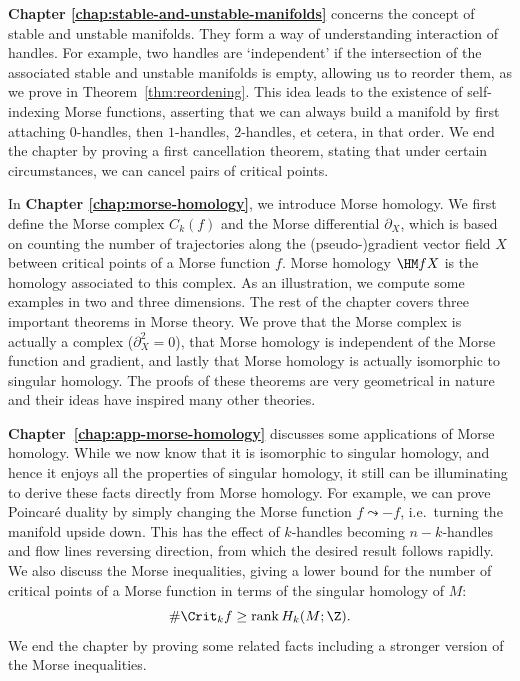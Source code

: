 \bigskip

\textbf{Chapter \ref{chap:stable-and-unstable-manifolds}} concerns the concept of stable and unstable manifolds.
They form a way of understanding interaction of handles.
For example, two handles are `independent' if the intersection of the associated stable and unstable manifolds is empty, allowing us to reorder them, as we prove in Theorem~\ref{thm:reordening}.
This idea leads to the existence of self-indexing Morse functions, asserting that we can always build a manifold by first attaching $0$-handles, then $1$-handles, $2$-handles, et cetera, in that order.
We end the chapter by proving a first cancellation theorem, stating that under certain circumstances, we can cancel pairs of critical points.

\bigskip
In \textbf{Chapter \ref{chap:morse-homology}}, we introduce Morse homology.
We first define the Morse complex $C_k(f)$ and the Morse differential $\partial_X$, which is based on counting the number of trajectories along the (pseudo-)gradient vector field $X$ between critical points of a Morse function $f$.
Morse homology $\HM f X$ is the homology associated to this complex.
As an illustration, we compute some examples in two and three dimensions.
The rest of the chapter covers three important theorems in Morse theory.
We prove that the Morse complex is actually a complex ($\partial_X^2 = 0$), that Morse homology is independent of the Morse function and gradient, and lastly that Morse homology is actually isomorphic to singular homology.
The proofs of these theorems are very geometrical in nature and their ideas have inspired many other theories.

\bigskip
\textbf{Chapter~\ref{chap:app-morse-homology}} discusses some applications of Morse homology.
While we now know that it is isomorphic to singular homology, and hence it enjoys all the properties of singular homology, it still can be illuminating to derive these facts directly from Morse homology.
For example, we can prove Poincaré duality by simply changing the Morse function $f \leadsto -f$, i.e.\ turning the manifold upside down.  This has the effect of $k$-handles becoming $n-k$-handles and flow lines reversing direction, from which the desired result follows rapidly.
We also discuss the Morse inequalities, giving a lower bound for the number of critical points of a Morse function in terms of the singular homology of $M$:
 \[
     \# \Crit_k f \ge \operatorname{rank} H_k(M; \Z)
.\] 
We end the chapter by proving some related facts including a stronger version of the Morse inequalities.

